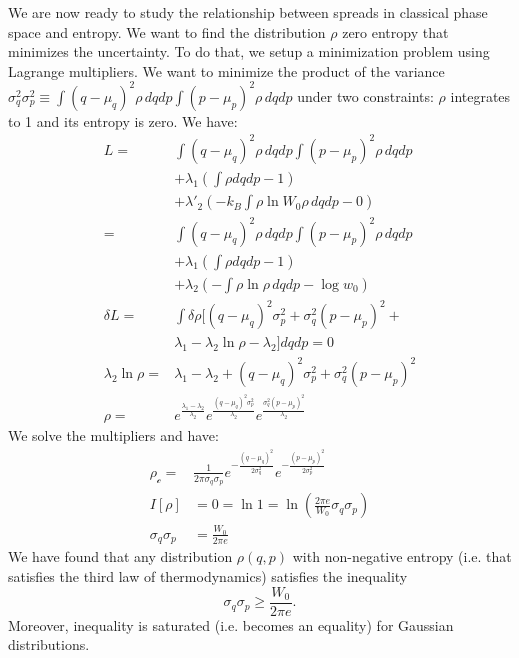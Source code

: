 We are now ready to study the relationship between spreads in classical phase space and entropy. We want to find the distribution $\rho$ zero entropy that minimizes the uncertainty. To do that, we setup a minimization problem using Lagrange multipliers. We want to minimize the product of the variance $\sigma_q^2 \sigma_p^2 \equiv \int (q-\mu_q)^2 \rho \, dqdp \int (p-\mu_p)^2 \rho \, dqdp$ under two constraints: $\rho$ integrates to 1 and its entropy is zero. We have: 
\begin{align*}
	L = &\int (q-\mu_q)^2 \rho \, dqdp \int (p-\mu_p)^2 \rho \, dqdp \\
	&+ \lambda_1(\int \rho dqdp - 1) \\ &+ \lambda'_2(- k_B \int \rho \ln W_0 \rho \, dqdp - 0)\\
	= &\int (q-\mu_q)^2 \rho \, dqdp \int (p-\mu_p)^2 \rho \, dqdp \\
&+ \lambda_1(\int \rho dqdp - 1) \\ &+ \lambda_2(- \int \rho \ln \rho \, dqdp - \log w_0)\\
	\delta L = &\int \delta \rho [(q-\mu_q)^2 \sigma_p^2 + \sigma_q^2 (p-\mu_p)^2 + \\ &\lambda_1 - \lambda_2 \ln \rho - \lambda_2 ] dqdp = 0 \\
	\lambda_2 \ln \rho = &\lambda_1 - \lambda_2 + (q-\mu_q)^2 \sigma_p^2 + \sigma_q^2 (p-\mu_p)^2 \\
	\rho = &e^{\frac{\lambda_1 - \lambda_2}{\lambda_2}}e^{\frac{(q-\mu_q)^2 \sigma_p^2}{\lambda_2}}e^{\frac{\sigma_q^2 (p-\mu_p)^2}{\lambda_2}}
\end{align*}
We solve the multipliers and have:
\begin{align*}
	\rho_{\mathcal{c}} = &\frac{1}{ 2 \pi \sigma_q \sigma_p} e^{-\frac{(q-\mu_q)^2}{2\sigma_q^2}} e^{-\frac{(p-\mu_p)^2}{2\sigma_p^2}} \\
	I[\rho] &= 0 = \ln 1 = \ln \left(\frac{2\pi e}{W_0} \sigma_q\sigma_p \right) \\
	\sigma_q \sigma_p &= \frac{W_0}{2 \pi e}
\end{align*}
We have found that any distribution $\rho(q,p)$ with non-negative entropy (i.e. that satisfies the third law of thermodynamics) satisfies the inequality
\begin{equation}\label{rp-cm-classicalUncertaintyPrinciple}
	\sigma_q \sigma_p \geq \frac{W_0}{2 \pi e}.
\end{equation}
Moreover, inequality is saturated (i.e. becomes an equality) for Gaussian distributions.

